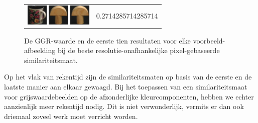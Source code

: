 \begin{figure}[tbp]
\begin{center}
\begin{tabular}{m{11cm} | m{3cm} |}
\includegraphics[width=1cm]{coil/beeld-64.eps}
\includegraphics[width=1cm]{coil/beeld-1.eps}
\includegraphics[width=1cm]{coil/beeld-0.eps}
& {\scriptsize 0.2714285714285714}
\end{tabular}
\caption{\label{fig:results_beste_pixelgeb}De GGR-waarde en de eerste tien resultaten voor elke voorbeeld-afbeelding bij de beste resolutie-onafhankelijke pixel-gebaseerde similariteitsmaat.}
\end{center}
\end{figure}

Op het vlak van rekentijd zijn de similariteitsmaten op basis van de eerste en de laatste manier
aan elkaar gewaagd. Bij het toepassen van een similariteitsmaat voor grijswaardebeelden op de 
afzonderlijke kleurcomponenten, hebben we echter aanzienlijk meer rekentijd nodig. Dit is niet
verwonderlijk, vermits er dan ook driemaal zoveel werk moet verricht worden.
